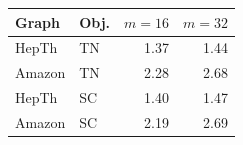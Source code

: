\begin{tabular}{llrr}
\toprule
Graph & Obj. & $m=16$ & $m=32$ \\
\midrule
HepTh & TN & 1.37 & 1.44 \\
Amazon & TN & 2.28 & 2.68 \\
HepTh & SC & 1.40 & 1.47 \\
Amazon & SC & 2.19 & 2.69 \\
\bottomrule
\end{tabular}
